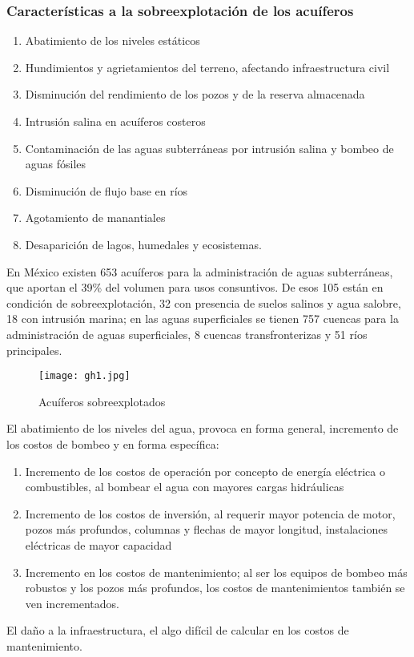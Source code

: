 \subsubsection{Características a la sobreexplotación de los acuíferos}
\begin{enumerate}
    \item Abatimiento de los niveles estáticos
    \item Hundimientos y agrietamientos del terreno, afectando infraestructura civil
    \item Disminución del rendimiento de los pozos y de la reserva almacenada
    \item Intrusión salina en acuíferos costeros
    \item Contaminación de las aguas subterráneas por intrusión salina y bombeo de aguas fósiles
    \item Disminución de flujo base en ríos
    \item Agotamiento de manantiales
    \item Desaparición de lagos, humedales y ecosistemas.
\end{enumerate}
En México existen 653 acuíferos para la administración de aguas subterráneas, que aportan el 39\% del volumen para usos consuntivos. De esos 105 están en condición de sobreexplotación, 32 con presencia de suelos salinos y agua salobre, 18 con intrusión marina; en las aguas superficiales se tienen 757 cuencas para la administración de aguas superficiales, 8 cuencas transfronterizas y 51 ríos principales.
\begin{figure}[h!]
\centering
  \texttt{[image: gh1.jpg]}
  \caption{Acuíferos sobreexplotados}
  \label{gh1}
\end{figure}
El abatimiento de los niveles del agua, provoca en forma general, incremento de los costos de bombeo y en forma específica:
\begin{enumerate}
    \item Incremento de los costos de operación por concepto de energía eléctrica o combustibles, al bombear el agua con mayores cargas hidráulicas
    \item Incremento de los costos de inversión, al requerir mayor potencia de motor, pozos más profundos, columnas y flechas de mayor longitud, instalaciones eléctricas de mayor capacidad
    \item Incremento en los costos de mantenimiento; al ser los equipos de bombeo más robustos y los pozos más profundos, los costos de mantenimientos también se ven incrementados. 
\end{enumerate}
El daño a la infraestructura, el algo difícil de calcular en los costos de mantenimiento.

